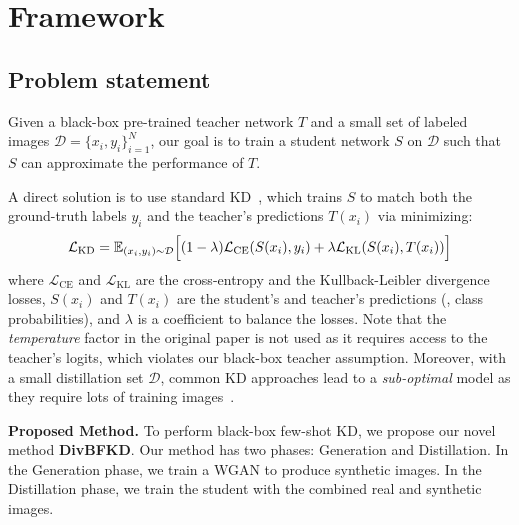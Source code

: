 \section{Framework} \label{sec:32-research01-framework}
\subsection{Problem statement}
\begin{foldable}
  Given a black-box pre-trained teacher network $T$ and a small set of labeled images $\mathcal{D}=\{x_{i},y_{i}\}_{i=1}^{N}$, our goal is to train a student network $S$ on $\mathcal{D}$ such that $S$ can approximate the performance of $T$.
\end{foldable}

\begin{foldable}
  A direct solution is to use standard \ac{KD}~\cite{hinton2015distilling}, which trains $S$ to match both the ground-truth labels $y_{i}$ and the teacher's predictions $T(x_{i})$ via minimizing:
  \begin{equation}
    \mathcal{L}_\text{KD} = \mathbb{E}_{(x_{i}, y_{i}) \sim \mathcal{D}} \Bigl[{
        (1 - \lambda) \mathcal{L}_{\text{CE}}(S(x_{i}), y_{i}) +
        \lambda \mathcal{L}_\text{KL}(S(x_{i}), T(x_{i}))
    }\Bigr]
    \label{eq:StandardKD}
  \end{equation}
  where $\mathcal{L}_{\text{CE}}$ and $\mathcal{L}_\text{KL}$ are the cross-entropy and the Kullback-Leibler divergence losses, $S(x_{i})$ and $T(x_{i})$ are the student's and teacher's predictions (\ie, class probabilities), and $\lambda$ is a coefficient to balance the losses.
  Note that the \textit{temperature} factor in the original paper is not used as it requires access to the teacher's logits, which violates our black-box teacher assumption.
  Moreover, with a small distillation set $\mathcal{D}$, common \ac{KD} approaches lead to a \textit{sub-optimal} model as they require lots of training images~\cite{hinton2015distilling,kim2018paraphrasing,ahn2019variational,tian2020contrastive}.
\end{foldable}

\begin{foldable}
  \textbf{Proposed Method.}
  To perform black-box few-shot \ac{KD}, we propose our novel method \textbf{DivBFKD}.
  Our method has two phases: Generation and Distillation.
  In the Generation phase, we train a WGAN to produce synthetic images.
  In the Distillation phase, we train the student with the combined real and synthetic images.
\end{foldable}

